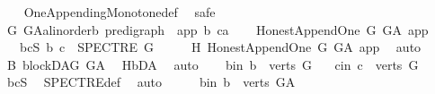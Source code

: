 \begin{isabellebody}
%
\isadelimproof
\ \ %
\endisadelimproof
%
\isatagproof
{}\isamarkupfalse%
\ One{\isacharunderscore}{\kern0pt}Appending{\isacharunderscore}{\kern0pt}Monotone{\isacharunderscore}{\kern0pt}def\ \isanewline
{}\isamarkupfalse%
\ safe\isanewline
\ \ \isamarkupfalse%
\ G\ G{\isacharunderscore}{\kern0pt}A{\isacharcolon}{\kern0pt}{\isacharcolon}{\kern0pt}{\isachardoublequoteopen}{\isacharparenleft}{\kern0pt}{\isacharprime}{\kern0pt}a{\isacharcolon}{\kern0pt}{\isacharcolon}{\kern0pt}linorder{\isacharcomma}{\kern0pt}{\isacharprime}{\kern0pt}b{\isacharparenright}{\kern0pt}\ pre{\isacharunderscore}{\kern0pt}digraph{\isachardoublequoteclose}\ \ app\ b\ c{\isacharcolon}{\kern0pt}{\isacharcolon}{\kern0pt}{\isacharprime}{\kern0pt}a\isanewline
\ \ \isamarkupfalse%
\ {\isachardoublequoteopen}Honest{\isacharunderscore}{\kern0pt}Append{\isacharunderscore}{\kern0pt}One\ G\ G{\isacharunderscore}{\kern0pt}A\ app{\isachardoublequoteclose}\isanewline
\ \ \ bcS{\isacharcolon}{\kern0pt}\ {\isachardoublequoteopen}{\isacharparenleft}{\kern0pt}b{\isacharcomma}{\kern0pt}\ c{\isacharparenright}{\kern0pt}\ {\isasymin}\ SPECTRE\ G{\isachardoublequoteclose}\isanewline
\ \ \isamarkupfalse%
\ \isamarkupfalse%
\ H{}{\isacharcolon}{\kern0pt}\ Honest{\isacharunderscore}{\kern0pt}Append{\isacharunderscore}{\kern0pt}One\ G\ G{\isacharunderscore}{\kern0pt}A\ app\ \isamarkupfalse%
\ auto\isanewline
\ \ \isamarkupfalse%
\ B{}{\isacharcolon}{\kern0pt}\ blockDAG\ G{\isacharunderscore}{\kern0pt}A\ \isamarkupfalse%
\ H{}{\isachardot}{\kern0pt}bD{\isacharunderscore}{\kern0pt}A\ \isamarkupfalse%
\ auto\isanewline
\ \ \isamarkupfalse%
\ b{\isacharunderscore}{\kern0pt}in{\isacharcolon}{\kern0pt}\ {\isachardoublequoteopen}b\ {\isasymin}\ verts\ G{\isachardoublequoteclose}\isanewline
\ \ \ c{\isacharunderscore}{\kern0pt}in{\isacharcolon}{\kern0pt}\ {\isachardoublequoteopen}c\ {\isasymin}\ verts\ G{\isachardoublequoteclose}\ \isamarkupfalse%
\ bcS\ \isamarkupfalse%
\ SPECTRE{\isacharunderscore}{\kern0pt}def\ \isamarkupfalse%
\ auto\isanewline
\ \ \isamarkupfalse%
\ \isamarkupfalse%
\ b{\isacharunderscore}{\kern0pt}in{}{\isacharcolon}{\kern0pt}\ {\isachardoublequoteopen}b\ {\isasymin}\ verts\ G{\isacharunderscore}{\kern0pt}A{\isachardoublequoteclose}\isanewline

\end{isabellebody}
